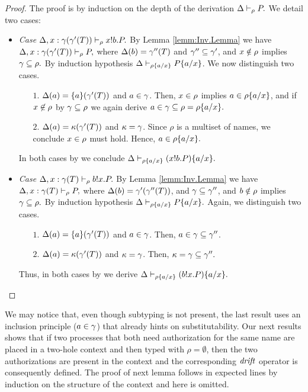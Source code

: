 \begin{proof}
The proof is by induction on the depth of the derivation $ \Delta\vdash_\rho P.$ We detail two cases:
\begin{itemize}
\item \emph{Case} $ \Delta,x:\gamma(\gamma'(T))\vdash_\rho x!b.P.$ 
By Lemma \ref{lemm:Inv.Lemma} we have $ \Delta, x:\gamma(\gamma'(T))\vdash_{\rho}P,$ where $\Delta(b)=\gamma''(T)$ and $\gamma''\subseteq\gamma'$, and $x\notin\rho$ implies $\gamma\subseteq\rho.$ 
By induction hypothesis 
$
\Delta\vdash_{\rho\{a/x\}} P\{a/x\}
$. We now distinguish two cases.
\begin{itemize}
\item [$1$.]  $\Delta(a)=\{a\}(\gamma'(T))$ and $a\in \gamma$. Then, $x\in\rho$ implies $a\in\rho\{a/x\}$, and if $x\not\in\rho$ by $\gamma\subseteq\rho$ we again derive $a\in\gamma\subseteq\rho=\rho\{a/x\}.$ 
\item [$2$.]  $\Delta(a)={\mathbf{\kappa}}(\gamma'(T))$ and ${\mathbf{\kappa}}=\gamma$. Since $\rho$ is a multiset of names, we conclude  $x\in\rho$ must hold. Hence, $a\in\rho\{a/x\}.$
\end{itemize}
In both cases by  we conclude $ \Delta\vdash_{\rho\{a/x\}} (x!b.P)\{a/x\}.$

\item \emph{Case} $ \Delta,x:\gamma(T)\vdash_\rho b!x.P.$ 
By Lemma \ref{lemm:Inv.Lemma} we have $ \Delta, x:\gamma(T)\vdash_{\rho}P,$ where $\Delta(b)=\gamma'(\gamma''(T))$, and $\gamma\subseteq\gamma''$, and $b\notin\rho$ implies $\gamma\subseteq\rho.$ 
By induction hypothesis $ \Delta\vdash_{\rho\{a/x\}} P\{a/x\}.$ Again, we distinguish two cases.
\begin{itemize}
\item [$1$.]  $\Delta(a)=\{a\}(\gamma'(T))$ and $a\in \gamma$. Then, $a\in\gamma\subseteq\gamma''$.
\item [$2$.]  $\Delta(a)={\mathbf{\kappa}}(\gamma'(T))$ and ${\mathbf{\kappa}}=\gamma$. Then, ${\mathbf{\kappa}}=\gamma\subseteq\gamma''.$
\end{itemize}
Thus, in both cases by  we derive $ \Delta\vdash_{\rho\{a/x\}} (b!x.P)\{a/x\}.$
\end{itemize}
\end{proof}
  
We may notice that, even though subtyping is not present, the last result uses an inclusion principle ($a \in \gamma$) that already hints on substitutability. Our next results shows that if two processes that both need authorization for the same name are placed in a two-hole context and then typed with $\rho=\emptyset$, then the two authorizations are present in the context and the corresponding $\mathit {drift}$ operator is consequently defined. The proof of next lemma follows in expected lines by induction on the structure of the context and here is omitted.


